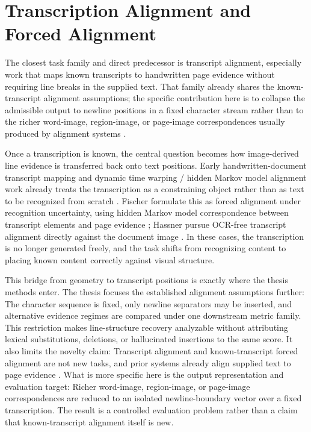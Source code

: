 \section{Transcription Alignment and Forced Alignment}
\label{sec:sota_transcription_alignment}

The closest task family and direct predecessor is transcript alignment, especially work that maps known transcripts to handwritten page evidence without requiring line breaks in the supplied text. That family already shares the known-transcript alignment assumptions; the specific contribution here is to collapse the admissible output to newline positions in a fixed character stream rather than to the richer word-image, region-image, or page-image correspondences usually produced by alignment systems .

Once a transcription is known, the central question becomes how image-derived line evidence is transferred back onto text positions. Early handwritten-document transcript mapping and dynamic time warping / hidden Markov model alignment work already treats the transcription as a constraining object rather than as text to be recognized from scratch . Fischer \etal formulate this as forced alignment under recognition uncertainty, using hidden Markov model correspondence between transcript elements and page evidence ; Hassner \etal pursue OCR-free transcript alignment directly against the document image . In these cases, the transcription is no longer generated freely, and the task shifts from recognizing content to placing known content correctly against visual structure.

This bridge from geometry to transcript positions is exactly where the thesis methods enter. The thesis focuses the established alignment assumptions further: The character sequence is fixed, only newline separators may be inserted, and alternative evidence regimes are compared under one downstream metric family. This restriction makes line-structure recovery analyzable without attributing lexical substitutions, deletions, or hallucinated insertions to the same score. It also limits the novelty claim: Transcript alignment and known-transcript forced alignment are not new tasks, and prior systems already align supplied text to page evidence . What is more specific here is the output representation and evaluation target: Richer word-image, region-image, or page-image correspondences are reduced to an isolated newline-boundary vector over a fixed transcription. The result is a controlled evaluation problem rather than a claim that known-transcript alignment itself is new.

